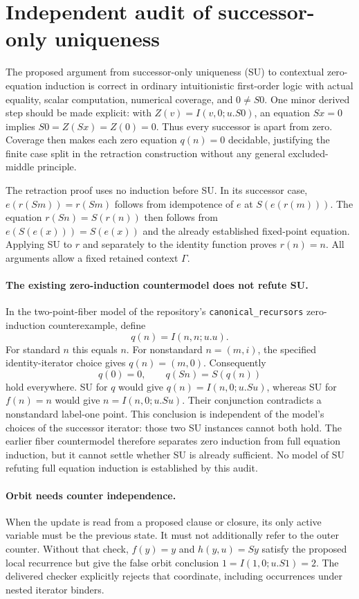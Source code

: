 \section{Independent audit of successor-only uniqueness}
The proposed argument from successor-only uniqueness (SU) to contextual
zero-equation induction is correct in ordinary intuitionistic first-order
logic with actual equality, scalar computation, numerical coverage, and
$0\ne S0$. One minor derived step should be made explicit: with
$Z(v)=I(v,0;u.S0)$, an equation $Sx=0$ implies
$S0=Z(Sx)=Z(0)=0$. Thus every successor is apart from zero.
Coverage then makes each zero equation $q(n)=0$ decidable, justifying the
finite case split in the retraction construction without any general
excluded-middle principle.

The retraction proof uses no induction before SU. In its successor case,
$e(r(Sm))=r(Sm)$ follows from idempotence of $e$ at
$S(e(r(m)))$. The equation $r(Sn)=S(r(n))$ then follows from
$e(S(e(x)))=S(e(x))$ and the already established fixed-point equation.
Applying SU to $r$ and separately to the identity function proves
$r(n)=n$. All arguments allow a fixed retained context $\Gamma$.

\paragraph{The existing zero-induction countermodel does not refute SU.}
In the two-point-fiber model of the repository's
\texttt{canonical\_recursors} zero-induction counterexample, define
\[
 q(n)=I(n,n;u.u).
\]
For standard $n$ this equals $n$. For nonstandard $n=(m,i)$, the specified
identity-iterator choice gives $q(n)=(m,0)$. Consequently
\[
 q(0)=0,\qquad q(Sn)=S(q(n))
\]
hold everywhere. SU for $q$ would give
$q(n)=I(n,0;u.Su)$, whereas SU for $f(n)=n$ would give
$n=I(n,0;u.Su)$. Their conjunction contradicts a nonstandard label-one
point. This conclusion is independent of the model's choices of the
successor iterator: those two SU instances cannot both hold.
The earlier fiber countermodel therefore separates zero induction from
full equation induction, but it cannot settle whether SU is already
sufficient. No model of SU refuting full equation induction is established
by this audit.

\paragraph{Orbit needs counter independence.}
When the update is read from a proposed clause or closure, its only active
variable must be the previous state. It must not additionally refer to the
outer counter. Without that check, $f(y)=y$ and $h(y,u)=Sy$ satisfy the
proposed local recurrence but give the false orbit conclusion
$1=I(1,0;u.S1)=2$. The delivered checker explicitly rejects that coordinate,
including occurrences under nested iterator binders.
